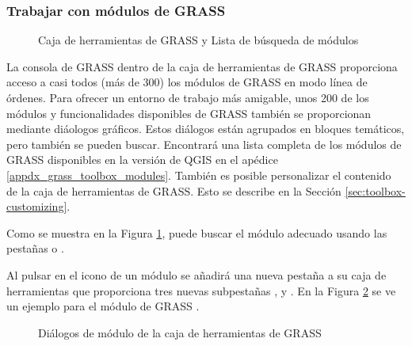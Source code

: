\subsubsection{Trabajar con módulos de GRASS}

\begin{figure}[h]
\centering
\caption{Caja de herramientas de GRASS y Lista de búsqueda de módulos \nixcaption}\label{fig:grass_modules}
   \goodgap
\end{figure}

La consola de GRASS dentro de la caja de herramientas de GRASS proporciona acceso a casi todos (más de 300) los módulos de
 GRASS en modo línea de órdenes. Para ofrecer un entorno de trabajo más amigable, unos 200 de los módulos y funcionalidades 
disponibles de GRASS también se proporcionan mediante diáologos gráficos. Estos diálogos están agrupados en bloques temáticos, 
pero también se pueden buscar. Encontrará una lista completa de los módulos de GRASS disponibles en la versión de QGIS \CURRENT
en el apédice \ref{appdx_grass_toolbox_modules}. También es posible personalizar el contenido de la caja de herramientas de 
GRASS. Esto se describe en la Sección \ref{sec:toolbox-customizing}.

Como se muestra en la Figura \ref{fig:grass_modules}, puede buscar el módulo adecuado usando las pestañas  o .

Al pulsar en el icono de un módulo se añadirá una nueva pestaña a su caja de herramientas que proporciona tres 
nuevas subpestañas ,  y . En la Figura \ref{fig:grass_module_dialog} se 
ve un ejemplo para el módulo de GRASS .

\begin{figure}[h]
\centering
\caption{Diálogos de módulo de la caja de herramientas de GRASS \nixcaption}\label{fig:grass_module_dialog}
   \goodgap
   \goodgap
\end{figure}

